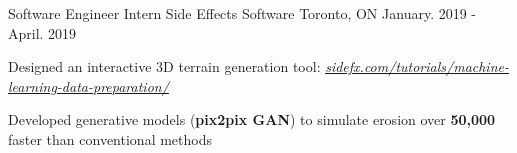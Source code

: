 \begin{cventries}
  \cventry
    {Software Engineer Intern} %
    {Side Effects Software} %
    {Toronto, ON} %
    {January. 2019 - April. 2019} %
    {
      \begin{cvitems} %
        \item {Designed an interactive 3D terrain generation tool: \href{https://www.sidefx.com/tutorials/machine-learning-data-preparation/}{\underline{\textit{sidefx.com/tutorials/machine-learning-data-preparation/}}}}
        \item {Developed generative models (\textbf{pix2pix GAN}) to
        simulate erosion over \textbf{50,000\times} faster than conventional methods}
      \end{cvitems}
    }


\end{cventries}
